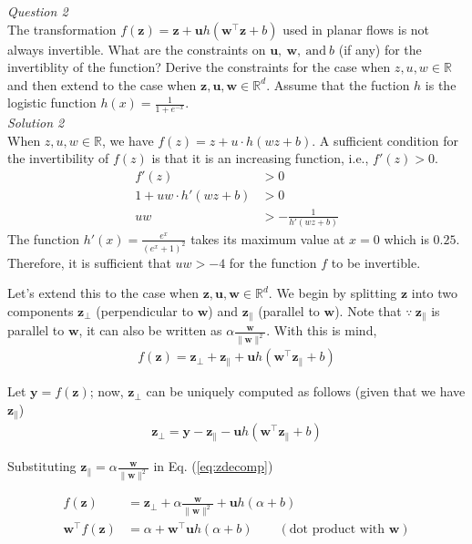 \documentclass{article}
\begin{document}
\noindent\emph{Question 2}
\\[3pt]
The transformation $f(\mathbf{z}) = \mathbf{z} + \mathbf{u}h(\mathbf{w}^\top\mathbf{z} + b)$ used  in planar flows is not always invertible. What are the constraints on $\mathbf{u},\:\mathbf{w},\:\text{and}\:b$ (if any) for the invertiblity of the function? Derive the constraints for the case when $z, u, w \in\mathbb{R}$ and then extend to the case when $\mathbf{z}, \mathbf{u},\mathbf{w}\in\mathbb{R}^d$. Assume that the fuction $h$ is the logistic function $h(x) = \frac{1}{1+e^{-x}}$.
\\[10pt]
\emph{Solution 2}
\\[3pt]
When $z, u, w \in\mathbb{R}$, we have $f(z) = z + u\cdot h(wz + b)$. A sufficient condition for the invertibility of $f(z)$ is that it is an increasing function, i.e., $f'(z) > 0$.
\begin{align*}
    f'(z) &> 0\\
    1 + uw\cdot h'(wz + b) &> 0\\
    uw &> -\frac{1}{h'(wz + b)}
\end{align*}
The function $h'(x) = \frac{e^x}{(e^x+1)^2}$ takes its maximum value at $x=0$ which is $0.25$. Therefore, it is sufficient that $uw > -4$ for the function $f$ to be invertible.

Let's extend this to the case when $\mathbf{z}, \mathbf{u},\mathbf{w}\in\mathbb{R}^d$. We begin by splitting $\mathbf{z}$ into two components $\mathbf{z}_\perp$ (perpendicular to $\mathbf{w}$) and $\mathbf{z}_\|$ (parallel to $\mathbf{w}$). Note that $\because\:\mathbf{z}_\|$ is parallel to $\mathbf{w}$, it can also be written as $\alpha\frac{\mathbf{w}}{\|\mathbf{w}\|^2}$. With this is mind,
\begin{align}
    f(\mathbf{z}) = \mathbf{z}_\perp + \mathbf{z}_\| + \mathbf{u}h(\mathbf{w}^\top\mathbf{z}_\| + b)
    \label{eq:zdecomp}
\end{align}

Let $\mathbf{y}=f(\mathbf{z})$; now, $\mathbf{z}_\perp$ can be uniquely computed as follows (given that we have $\mathbf{z}_\|$)
\begin{align}
    \mathbf{z}_\perp = \mathbf{y} - \mathbf{z}_\| - \mathbf{u}h(\mathbf{w}^\top\mathbf{z}_\| + b)
\end{align}

Substituting $\mathbf{z}_\| = \alpha\frac{\mathbf{w}}{\|\mathbf{w}\|^2}$ in Eq. (\ref{eq:zdecomp})

\begin{align}
    f(\mathbf{z}) &= \mathbf{z}_\perp + \alpha\frac{\mathbf{w}}{\|\mathbf{w}\|^2} + \mathbf{u}h(\alpha + b)\\
    \mathbf{w}^\top f(\mathbf{z}) &= \alpha + \mathbf{w}^\top\mathbf{u}h(\alpha + b)\qquad (\mbox{dot product with }\mathbf{w})\label{eq:alphainv}
\end{align}
\end{document}
